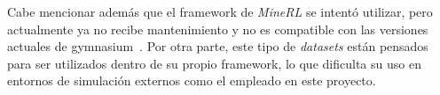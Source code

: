 \begin{table}[htbp]
  \centering
  \caption[Conjuntos de datos analizados]{Comparación de los conjuntos de datos analizados en el trabajo.}
  \label{tab:datasets}
\end{table}

Cabe mencionar además que el \gls{framework} de \textit{MineRL} se intentó utilizar, pero actualmente ya no recibe mantenimiento y no es compatible con las versiones actuales de \gls{gymnasium}~\cite{minerl_issue788}. Por otra parte,
este tipo de \textit{datasets} están pensados para ser utilizados dentro de su propio \gls{framework}, 
lo que dificulta su uso en entornos de simulación externos como el empleado en este proyecto.